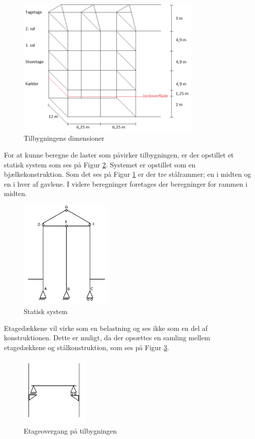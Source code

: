 \begin{figure}[H]
	\centering
	\includegraphics[width=0.8\textwidth]{billeder/tilbygning2.png}
	\caption{Tilbygningens dimensioner}
	\label{fig:farvel}
\end{figure}

For at kunne beregne de laster som påvirker tilbygningen, er der opstillet et statisk system som ses på Figur \ref{fig:system}. Systemet er opstillet som en bjælkekonstruktion. Som det ses på Figur \ref{fig:farvel} er der tre stålrammer; en i midten og en i hver af gavlene. I videre beregninger foretages der beregninger for rammen i midten.

\begin{figure}[H]
	\centering
	\includegraphics[width=0.4\textwidth]{billeder/del1statiskesystem.png}
	\caption{Statisk system}
	\label{fig:system}
\end{figure}

Etagedækkene vil virke som en belastning og ses ikke som en del af konstruktionen. Dette er muligt, da der opsættes en samling mellem etagedækkene og stålkonstruktion, som ses på Figur \ref{fig:etage}.

\begin{figure}[H]
	\centering
	\includegraphics[width=0.3\textwidth]{billeder/etageovergang.png}
	\caption{Etageovergang på tilbygningen}
	\label{fig:etage}
\end{figure}

